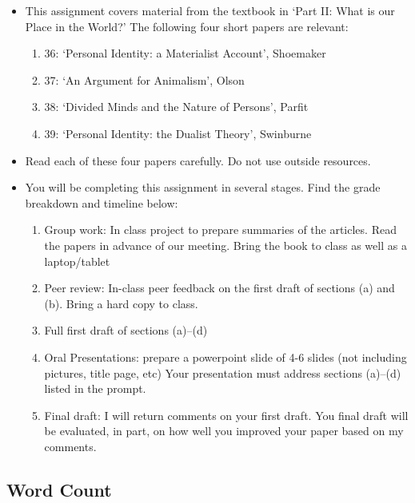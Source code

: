 \documentclass[]{article}
\providecommand{\tightlist}{%
  \setlength{\itemsep}{0pt}\setlength{\parskip}{0pt}}
\begin{document}
\begin{itemize}
\item
  This assignment covers material from the textbook in `Part II: What is
  our Place in the World?' The following four short papers are relevant:

  \begin{enumerate}
  \def\labelenumi{\arabic{enumi}.}
  \tightlist
  \item
    36: `Personal Identity: a Materialist Account', Shoemaker
  \item
    37: `An Argument for Animalism', Olson
  \item
    38: `Divided Minds and the Nature of Persons', Parfit
  \item
    39: `Personal Identity: the Dualist Theory', Swinburne
  \end{enumerate}
\item
  Read each of these four papers carefully. Do not use outside
  resources.
\item
  You will be completing this assignment in several stages. Find the
  grade breakdown and timeline below:

  \begin{enumerate}
  \def\labelenumi{\arabic{enumi}.}
  \tightlist
  \item
    Group work: In class project to prepare summaries of the articles.
    Read the papers in advance of our meeting. Bring the book to class
    as well as a laptop/tablet
  \item
    Peer review: In-class peer feedback on the first draft of sections
    (a) and (b). Bring a hard copy to class.
  \item
    Full first draft of sections (a)--(d)
  \item
    Oral Presentations: prepare a powerpoint slide of 4-6 slides (not
    including pictures, title page, etc) Your presentation must address
    sections (a)--(d) listed in the prompt.\\
  \item
    Final draft: I will return comments on your first draft. You final
    draft will be evaluated, in part, on how well you improved your
    paper based on my comments.
  \end{enumerate}
\end{itemize}

\subsection{Word Count}\label{word-count}
\end{document}
